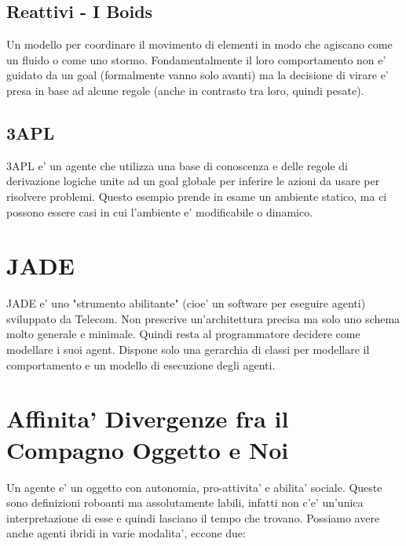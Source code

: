\subsection{Reattivi - I Boids}

Un modello per coordinare il movimento di elementi in modo che agiscano come un fluido o come uno stormo.
Fondamentalmente il loro comportamento non e' guidato da un goal (formalmente vanno solo avanti) ma la decisione di virare e' presa in base ad alcune regole (anche in contrasto tra loro, quindi pesate).


\subsection{3APL}

3APL e' un agente che utilizza una base di conoscenza e delle regole di derivazione logiche unite ad un goal globale per inferire le azioni da usare per risolvere problemi.
Questo esempio prende in esame un ambiente statico, ma ci possono essere casi in cui l'ambiente e' modificabile o dinamico.


\section{JADE}

JADE e' uno "strumento abilitante" (cioe' un software per eseguire agenti) sviluppato da Telecom. Non prescrive un'architettura precisa ma solo uno schema molto generale e minimale. Quindi resta al programmatore decidere come modellare i suoi agent.
Dispone solo una gerarchia di classi per modellare il comportamento e un modello di esecuzione degli agenti.


\section{Affinita' Divergenze fra il Compagno Oggetto e Noi}

Un agente e' un oggetto con autonomia, pro-attivita' e abilita' sociale. Queste sono definizioni roboanti ma assolutamente labili, infatti non c'e' un'unica interpretazione di esse e quindi lasciano il tempo che trovano.
Possiamo avere anche agenti ibridi in varie modalita', eccone due:

